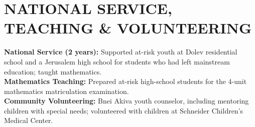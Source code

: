 \documentclass[10pt,a4paper]{article}
\begin{document}
\section*{NATIONAL SERVICE, TEACHING \& VOLUNTEERING}
\textbf{National Service (2 years):} Supported at-risk youth at Dolev residential school and a Jerusalem high school for students who had left mainstream education; taught mathematics.\\
\textbf{Mathematics Teaching:} Prepared at-risk high-school students for the 4-unit mathematics matriculation examination.\\
\textbf{Community Volunteering:} Bnei Akiva youth counselor, including mentoring children with special needs; volunteered with children at Schneider Children's Medical Center.
\end{document}
